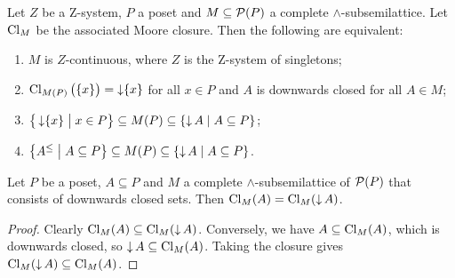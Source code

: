 \begin{corollary}
Let $Z$ be a $\mathrm{Z}$-system, $P$ a poset and $M \subseteq \operatorname{\mathcal{P}}(P)$ a complete $\wedge$-subsemilattice. Let $\operatorname{Cl}_{M}$ be the associated Moore closure. Then the following are equivalent:
\begin{enumerate}
\item $M$ is $Z$-continuous, where $Z$ is the $\mathrm{Z}$-system of singletons;
\item $\operatorname{Cl}_{M(P)}\big(\{x\}\big) = \operatorname{\downarrow}\{x\}$ for all $x\in P$ and $A$ is downwards closed for all $A\in M$;
\item $\setbuilder[\big]{\downset\{x\}}{x\in P} \subseteq M(P) \subseteq \setbuilder{\downset A}{A\subseteq P}$;
\item $\setbuilder{A^\leq}{A\subseteq P} \subseteq M(P) \subseteq \setbuilder{\downset A}{A\subseteq P}$.
\end{enumerate}
\end{corollary}

\begin{lemma} \label{closureDownwardsClosedSets}
Let $P$ be a poset, $A\subseteq P$ and $M$ a complete $\wedge$-subsemilattice of $\operatorname{\mathcal{P}}(P)$ that consists of downwards closed sets. Then $\operatorname{Cl}_M(A) = \operatorname{Cl}_M(\operatorname{\downarrow} A)$.
\end{lemma}
\begin{proof}
Clearly $\operatorname{Cl}_{M}(A) \subseteq \operatorname{Cl}_{M}(\operatorname{\downarrow} A)$. Conversely, we have $A\subseteq \operatorname{Cl}_{M}(A)$, which is downwards closed, so $\operatorname{\downarrow} A \subseteq \operatorname{Cl}_{M}(A)$. Taking the closure gives $\operatorname{Cl}_{M}(\operatorname{\downarrow} A) \subseteq \operatorname{Cl}_{M}(A)$.
\end{proof}

